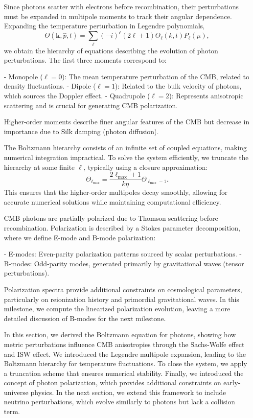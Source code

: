 \documentclass{aa}
\begin{document}
Since photons scatter with electrons before recombination, their perturbations must be expanded in multipole moments to track their angular dependence. Expanding the temperature perturbation in Legendre polynomials,
\begin{equation}
\Theta(\mathbf{k}, \hat{p}, t) = \sum_{\ell} (-i)^\ell (2\ell + 1) \Theta_\ell (k, t) P_\ell(\mu),
\end{equation}
we obtain the hierarchy of equations describing the evolution of photon perturbations. The first three moments correspond to:

- Monopole ($\ell = 0$): The mean temperature perturbation of the CMB, related to density fluctuations.
- Dipole ($\ell = 1$): Related to the bulk velocity of photons, which sources the Doppler effect.
- Quadrupole ($\ell = 2$): Represents anisotropic scattering and is crucial for generating CMB polarization.

Higher-order moments describe finer angular features of the CMB but decrease in importance due to Silk damping (photon diffusion).

The Boltzmann hierarchy consists of an infinite set of coupled equations, making numerical integration impractical. To solve the system efficiently, we truncate the hierarchy at some finite $\ell$, typically using a closure approximation:
\begin{equation}
\Theta_{\ell_{\max}} = \frac{2\ell_{\max} + 1}{k \eta} \Theta_{\ell_{\max} - 1}.
\end{equation}
This ensures that the higher-order multipoles decay smoothly, allowing for accurate numerical solutions while maintaining computational efficiency.

CMB photons are partially polarized due to Thomson scattering before recombination. Polarization is described by a Stokes parameter decomposition, where we define E-mode and B-mode polarization:

- E-modes: Even-parity polarization patterns sourced by scalar perturbations.
- B-modes: Odd-parity modes, generated primarily by gravitational waves (tensor perturbations).

Polarization spectra provide additional constraints on cosmological parameters, particularly on reionization history and primordial gravitational waves. In this milestone, we compute the linearized polarization evolution, leaving a more detailed discussion of B-modes for the next milestone.

In this section, we derived the Boltzmann equation for photons, showing how metric perturbations influence CMB anisotropies through the Sachs-Wolfe effect and ISW effect. We introduced the Legendre multipole expansion, leading to the Boltzmann hierarchy for temperature fluctuations. To close the system, we apply a truncation scheme that ensures numerical stability. Finally, we introduced the concept of photon polarization, which provides additional constraints on early-universe physics. In the next section, we extend this framework to include neutrino perturbations, which evolve similarly to photons but lack a collision term.
\color{black}
\end{document}
